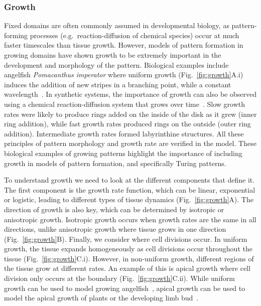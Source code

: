  \subsubsection{Growth}\label{growth_intro}
Fixed domains are often commonly assumed in developmental biology, as pattern-forming processes (e.g.~reaction-diffusion of chemical species) occur at much faster timescales than tissue growth.
However, models of pattern formation in growing domains have shown growth to be extremely important in the development and morphology of the pattern.
Biological examples include angelﬁsh \textit{Pomacanthus imperator} where uniform growth (Fig.~\ref{fig:growth}A.i) induces the addition of new stripes in a branching point, while a constant wavelength~\parencite{Kondo1995}.
In synthetic systems, the importance of growth can also be observed using a chemical reaction-diffusion system that grows over time~\parencite{Konow2019}.
Slow growth rates were likely to produce rings added on the inside of the disk as it grew (inner ring addition), while fast growth rates produced rings on the outside (outer ring addition).
Intermediate growth rates formed labyrinthine structures.
All these principles of pattern morphology and growth rate are verified in the model.
These biological examples of growing patterns highlight the importance of including growth in models of pattern formation, and specifically Turing patterns.

To understand growth we need to look at the different components that define it.
The first component is the growth rate function, which can be linear, exponential or logistic, leading to different types of tissue dynamics (Fig.~\ref{fig:growth}A).
The direction of growth is also key, which can be determined by isotropic or anisotropic growth.
Isotropic growth occurs when growth rates are the same in all directions, unlike anisotropic growth where tissue grows in one direction (Fig.~\ref{fig:growth}B).
Finally, we consider where cell divisions occur.
In uniform growth, the tissue expands homogeneously as cell divisions occur throughout the tissue (Fig.~\ref{fig:growth}C.i).
However, in non-uniform growth, different regions of the tissue grow at different rates.
An example of this is apical growth where cell division only occurs at the boundary (Fig.~\ref{fig:growth}C.ii).
While uniform growth can be used to model growing angelfish~\parencite{Kondo1995}, apical growth can be used to model the apical growth of plants or the developing limb bud~\parencite{crampin2002pattern}.




